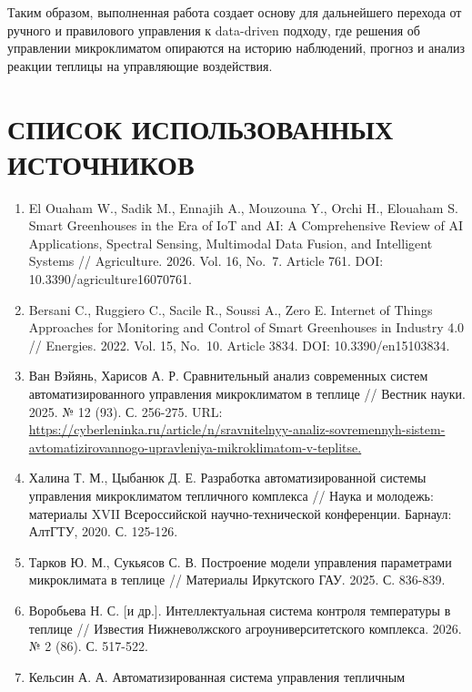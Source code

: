 \documentclass[a4paper,14pt]{extarticle}
\providecommand{\tightlist}{%
  \setlength{\itemsep}{0pt}\setlength{\parskip}{0pt}}
\begin{document}
Таким образом, выполненная работа создает основу для дальнейшего
перехода от ручного и правилового управления к data-driven подходу, где
решения об управлении микроклиматом опираются на историю наблюдений,
прогноз и анализ реакции теплицы на управляющие воздействия.

\section{СПИСОК ИСПОЛЬЗОВАННЫХ
ИСТОЧНИКОВ}\label{ux441ux43fux438ux441ux43eux43a-ux438ux441ux43fux43eux43bux44cux437ux43eux432ux430ux43dux43dux44bux445-ux438ux441ux442ux43eux447ux43dux438ux43aux43eux432}

\begin{enumerate}
\def\labelenumi{\arabic{enumi})}
\tightlist
\item
  El Ouaham W., Sadik M., Ennajih A., Mouzouna Y., Orchi H., Elouaham S.
  Smart Greenhouses in the Era of IoT and AI: A Comprehensive Review of
  AI Applications, Spectral Sensing, Multimodal Data Fusion, and
  Intelligent Systems // Agriculture. 2026. Vol. 16, No.~7. Article 761.
  DOI: 10.3390/agriculture16070761.
\item
  Bersani C., Ruggiero C., Sacile R., Soussi A., Zero E. Internet of
  Things Approaches for Monitoring and Control of Smart Greenhouses in
  Industry 4.0 // Energies. 2022. Vol. 15, No.~10. Article 3834. DOI:
  10.3390/en15103834.
\item
  Ван Вэйянь, Харисов А. Р. Сравнительный анализ современных систем
  автоматизированного управления микроклиматом в теплице // Вестник
  науки. 2025. № 12 (93). С. 256-275. URL:
  \url{https://cyberleninka.ru/article/n/sravnitelnyy-analiz-sovremennyh-sistem-avtomatizirovannogo-upravleniya-mikroklimatom-v-teplitse.}
\item
  Халина Т. М., Цыбанюк Д. Е. Разработка автоматизированной системы
  управления микроклиматом тепличного комплекса // Наука и молодежь:
  материалы XVII Всероссийской научно-технической конференции. Барнаул:
  АлтГТУ, 2020. С. 125-126.
\item
  Тарков Ю. М., Сукьясов С. В. Построение модели управления параметрами
  микроклимата в теплице // Материалы Иркутского ГАУ. 2025. С. 836-839.
\item
  Воробьева Н. С. {[}и др.{]}. Интеллектуальная система контроля
  температуры в теплице // Известия Нижневолжского агроуниверситетского
  комплекса. 2026. № 2 (86). С. 517-522.
\item
  Кельсин А. А. Автоматизированная система управления тепличным

\end{enumerate}
\end{document}
